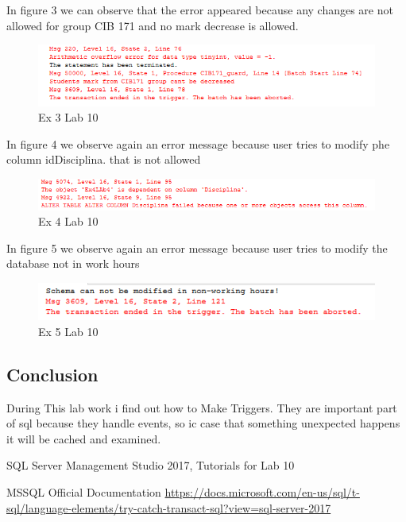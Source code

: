 \documentclass[12pt]{article}
\begin{document}
        In figure 3 we can observe that the error appeared because any changes are not allowed for group CIB 171 and no mark decrease is allowed.
        \begin{figure}[H]
                \centering
                \includegraphics[width = \textwidth]{img3.png}
                \caption{Ex 3 Lab 10}
        \end{figure}
        \vspace{0.5 cm}

        In figure 4 we observe again an error message because user tries to modify  phe column idDisciplina. that is not allowed
        \begin{figure}[H]
                \centering
                \includegraphics[width=\textwidth]{img4.png}
                \caption{Ex 4 Lab 10}
        \end{figure}
        \vspace{0.5 cm}

        In figure 5 we observe again an error message because user tries to modify the database not in work hours
        \begin{figure}[H]
                \centering
                \includegraphics[width=\textwidth]{img5.png}
                \caption{Ex 5 Lab 10}
        \end{figure}
        \vspace{0.5 cm}
      
      
        
        \newpage 
        \subsection*{Conclusion}
        During This lab work i find out how to Make Triggers. They are important part of sql because they handle events, so ic case that something unexpected happens it will be cached and examined.
        \cite{SQLServerManagementStudio}
        

 
\medskip
 
\begin{thebibliography}{9}
SQL Server Management Studio 2017, Tutorials for Lab 10

MSSQL Official Documentation
\url{https://docs.microsoft.com/en-us/sql/t-sql/language-elements/try-catch-transact-sql?view=sql-server-2017}
\end{thebibliography}
                
\end{document}
